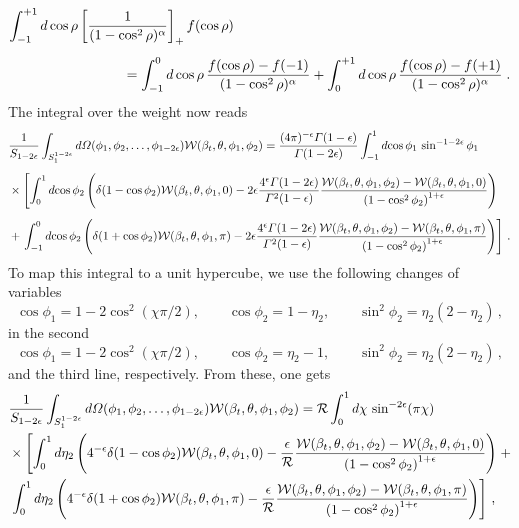 \documentclass[a4paper,11pt]{article}
\newcommand{\calW}{{\cal W}}
\newcommand{\calR}{{\cal R}}
\numberwithin{equation}{section}
\begin{document}
\begin{align}
  \int_{-1}^{+1} {d}\cos\rho \left[
  \frac{1}{(1-\cos^2\rho)^\alpha} \right]_+ f(\cos\rho) 
  & 
  \\[0.5em]
  & \hspace{-80pt} =
  \int_{-1}^{0} {d}\cos\rho \,
  \frac{f(\cos\rho)-f(-1)}{(1-\cos^2\rho)^\alpha} 
  + \int_{0}^{+1} {d}\cos\rho \,
  \frac{f(\cos\rho)-f(+1)}{(1-\cos^2\rho)^\alpha}
  \; .
  \nonumber
\end{align}
%
The integral over the weight now reads
%
\begin{align}
  & \frac{1}{S_{1-2\epsilon}}\int_{S_1^{1-2\epsilon}}
  d\Omega (\phi_1,\phi_2,\ldots,\phi_{1-2\epsilon})   
  \calW(\beta_t,\theta,\phi_1,\phi_2)=
  \frac{(4\pi)^{-\epsilon}\Gamma(1-\epsilon)}{\Gamma(1-2\epsilon)}
  \int_{-1}^{1}d\!\cos{\phi_1}\,\sin^{-1-2\epsilon}\phi_1 
  \nonumber \\[0.5em]
  & \times \left[ 
  \int_{0}^{1}d\!\cos{\phi_2} \left( \delta(1-\cos{\phi_2})
  \calW(\beta_t,\theta,\phi_1,0)
  -2\epsilon \frac{4^\epsilon \Gamma(1-2\epsilon)}{\Gamma^2(1-\epsilon)} 
  \frac{\calW(\beta_t,\theta,\phi_1,\phi_2)-
  \calW(\beta_t,\theta,\phi_1,0)}{\left( 1-\cos^2\phi_2\right)^{1+\epsilon}}  \right)
  \right.
  \nonumber \\[0.5em]
  &+ \left.
  \int^{0}_{-1}d\!\cos{\phi_2} \left( \delta(1+\cos{\phi_2})
  \calW(\beta_t,\theta,\phi_1,\pi)
  -2\epsilon \frac{4^\epsilon \Gamma(1-2\epsilon)}{\Gamma^2(1-\epsilon)} 
  \frac{\calW(\beta_t,\theta,\phi_1,\phi_2)-\calW(\beta_t,\theta,
  \phi_1,\pi)}{\left( 1-\cos^2\phi_2\right)^{1+\epsilon}}  \right)
  \right]\,.
\end{align}
%
%
To map this integral to a unit hypercube, we use the following changes 
of variables
%
\begin{equation}
  \cos\phi_1= 1-2 \cos^2(\chi \pi /2) , \qquad 
  \cos\phi_2= 1-\eta_2, \qquad
  \sin^2\phi_2=\eta_2(2-\eta_2)\,,
\end{equation}
%
in the second 
%
\begin{equation}
  \cos\phi_1= 1-2 \cos^2(\chi \pi /2) , \qquad 
  \cos\phi_2= \eta_2-1, \qquad
   \sin^2\phi_2=\eta_2(2-\eta_2)\,,
\end{equation}
and the third line, respectively.
%
From these, one gets 
%
\begin{align}
  & \frac{1}{S_{1-2\epsilon}}\int_{S_1^{1-2\epsilon}}
  d\Omega (\phi_1,\phi_2,\ldots,\phi_{1-2\epsilon})   
  \calW(\beta_t,\theta,\phi_1,\phi_2)=
  \calR
  \int_{0}^{1}  d \chi \, \sin^{-2\epsilon}(\pi \chi)
   \nonumber\\
  & \times \left[ 
  \int_{0}^{1}d \eta_2 
  \left( 4^{-\epsilon}
  \delta(1-\cos{\phi_2}) \calW(\beta_t,\theta,\phi_1,0)
  -\frac{\epsilon}{\calR} 
  \frac{\calW(\beta_t,\theta,\phi_1,\phi_2)-\calW(\beta_t,\theta,
  \phi_1,0)}{\left( 1-\cos^2\phi_2\right)^{1+\epsilon}}  \right)
  \right.+\nonumber \\
  &\left.
  \int_{0}^{1}d \eta_2 \left( 
  4^{-\epsilon} \delta(1+\cos{\phi_2}) \calW(\beta_t,\theta,
  \phi_1,\pi)
  -\frac{\epsilon}{\calR} 
  \frac{\calW(\beta_t,\theta,\phi_1,\phi_2)-\calW(\beta_t,\theta,
  \phi_1,\pi)}{\left( 1-\cos^2\phi_2\right)^{1+\epsilon}}  \right) 
  \right]\,,
  \label{eq:v3average}
\end{align}
\end{document}
